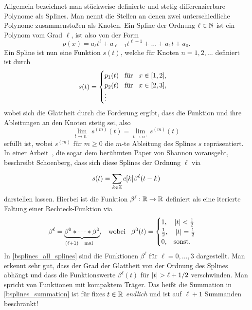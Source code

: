 Allgemein bezeichnet man st\"uckweise definierte und stetig differenzierbare Polynome als Splines. Man nennt die Stellen an denen zwei unterschiedliche Polynome zusammensto{\ss}en als Knoten. Ein Spline der Ordnung $\ell \in \mathbb{N}$ ist ein Polynom vom Grad $\ell$, ist also von der Form
\begin{equation}
    p(x) = 
        a_{\ell} t^{\ell} 
        + a_{\ell - 1} t^{\ell-1} 
        + \dots
        + a_1 t 
        + a_{0}.
\end{equation}
%
Ein Spline ist nun eine Funktion $s(t)$, welche f\"ur Knoten $n = 1, 2, \dots$ definiert ist durch
\begin{equation}
    s(t) = \begin{cases}
        p_1(t) {\hspace{3mm} \text{f\"ur} \hspace{3mm}} x \in [1,2], \\
        p_2(t) {\hspace{3mm} \text{f\"ur} \hspace{3mm}} x \in [2,3], \\
        \vdots
    \end{cases}
\end{equation}
wobei sich die Glattheit durch die Forderung ergibt, dass die Funktion und ihre Ableitungen an den Knoten stetig sei, also
\begin{equation}
    \lim\limits_{t \rightarrow n^-} s^{(m)}(t) =
    \lim\limits_{t \rightarrow n^+} s^{(m)}(t)
\end{equation}
erf\"ullt ist, wobei $s^{(m)}$ f\"ur $m \geqslant 0$ die $m$-te Ableitung des Splines $s$ repr\"asentiert. In einer Arbeit~\cite{schoenberg1988bsplines}, die sogar dem ber\"uhmten Paper von Shannon vorausgeht, beschreibt Schoenberg, dass sich diese Splines der Ordnung $\ell$ via
\begin{equation}\label{bsplines_summation}
    s(t) = {\sum\limits_{k \in \mathbb{Z}}^{}{
        c[k] \beta^{\ell}(t - k)
    }}
\end{equation}
darstellen lassen. Hierbei ist die Funktion $\beta^\ell: \mathbb{R} \rightarrow \mathbb{R}$ definiert als eine iterierte Faltung einer Rechteck-Funktion via
\begin{equation}
    \beta^\ell = \underbrace{
        \beta^0 \ast \dots \ast \beta^0
    }_{(\ell+1) {\hspace{3mm} \text{mal} \hspace{3mm}}}, 
    {\hspace{3mm} \text{wobei} \hspace{3mm}}
    \beta^0(t) = \begin{cases}
        1,\quad {\left| t \right|} < \frac{1}{2} \\
        \frac{1}{2}, \quad {\left| t \right|} = \frac{1}{2} \\
        0, {\hspace{3mm} \text{sonst.} \hspace{3mm}}
    \end{cases}
\end{equation}
In \cref{bsplines_all_splines} sind die Funktionen $\beta^\ell$ f\"ur $\ell = 0, \dots, 3$ dargestellt. Man erkennt sehr gut, dass der Grad der Glattheit von der Ordnung des Splines abh\"angt und dass die Funktionswerte $\beta^\ell(t)$ f\"ur ${\left| t \right|}>\ell+1/2$ verschwinden. Man spricht von Funktionen mit kompaktem Tr\"ager. Das hei{\ss}t die Summation in \eqref{bsplines_summation} ist f\"ur fixes $t \in \mathbb{R}$ \emph{endlich} und ist auf $\ell+1$ Summanden beschr\"ankt!
